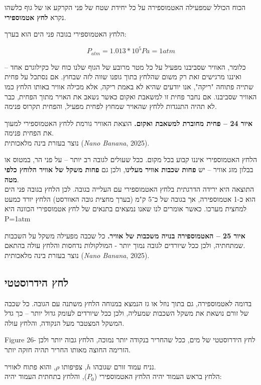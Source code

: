 \documentclass[
  hebrew,
  letterpaper,
  DIV=11,
  numbers=noendperiod]{scrreprt}
\begin{document}
{הכוח הכולל שמפעילה האטמוספירה על כל יחידת שטח של פני הקרקע או של גוף
כלשהו נקרא \textbf{לחץ אטמוספירי}}.

{הלחץ האטמוספירי בגובה פני הים הוא בערך}:

\[P_{atm} = 1.013*10^{5}Pa = 1atm\]

{כלומר, האוויר שסביבנו מפעיל על כל מטר מרובע של הגוף שלנו כוח של
כקילוגרם אחד -- ואיננו מרגישים זאת רק משום שהלחץ בתוך גופנו שווה לזה
שבחוץ}. {אם נסתכל על פחית שתייה פתוחה "ריקה", אנו יודעים שהיא לא באמת
ריקה, אלא מכילה אוויר באותו הלחץ כמו האוויר שסביבנו. אם נחבר פחית זו
למשאבת ואקום כאשר נשאב את האויר מתוך הפחית, כבר לא תהיה התנגדות ללחץ
שהאויר שמחוץ לפחית מפעיל, והפחית תקרוס פנימה.}

\textbf{איור 24 -- פחית מחוברת למשאבת ואקום.} הוצאת האוויר גורמת ללחץ
האטמוספירי למעוך את הפחית פנימה.\\
נוצר בעזרת בינה מלאכותית (\emph{Nano Banana}, 2025).

{הלחץ האטמוספירי איננו קבוע בכל מקום}. {ככל שעולים לגובה רב יותר -- על
פני הר, במטוס או בבלון מזג אוויר -- יש \textbf{פחות שכבות אוויר
מעלינו}}, {ולכן גם \textbf{פחות משקל של אוויר הלוחץ כלפי מטה}}.\\
{התוצאה היא ירידה הדרגתית בלחץ האטמוספירי עם העלייה בגובה. לכן הלחץ
בגובה פני הים הוא כ-1 אטמוספירה, אך בגובה של כ־5 ק"מ (בערך מחצית גובה
האוורסט) הלחץ יורד כמעט למחצית מערכו}.{\hfill\break
כאשר אומרים לנו שאנו נמצאים בתנאים של לחץ אטמוספירי הכוונה היא} P=1atm

\textbf{איור 25 -- האטמוספירה בנויה משכבות של אוויר.} כל שכבה מפעילה
משקל על השכבות שמתחתיה, ולכן ככל שיורדים לגובה נמוך יותר - המולקולות
נדחסות והלחץ עולה בהתאם.\\
נוצר בעזרת בינה מלאכותית (\emph{Nano Banana}, 2025).

\subsection{\texorpdfstring{{לחץ
הידרוסטטי}}{לחץ הידרוסטטי}}\label{ux5dcux5d7ux5e5-ux5d4ux5d9ux5d3ux5e8ux5d5ux5e1ux5d8ux5d8ux5d9}

{בדומה לאטמוספירה, גם בתוך נוזל או גז הנמצא במנוחה הלחץ משתנה עם הגובה.
כל שכבה של זורם נושאת את משקל השכבות שמעליה, ולכן ככל שיורדים לעומק גדול
יותר -- כך גדל המשקל המצטבר מעל הנקודה, והלחץ עולה}. {}

Figure {26- לחץ הידרוסטטי של מים, ככל שהחריר בנקודה יותר נמוכה, הלחץ
גבוה יותר ולכן הזרימה החוצה מאותו החריר תהיה חזקה יותר.}

נניח עמוד זורם שגובהו \(h\), צפיפותו \(\rho\), והוא פתוח לאוויר.\\
הלחץ בראש העמוד יהיה הלחץ האטמוספירי (\(P_{0}\)), והלחץ בתחתית העמוד
יהיה:
\end{document}
